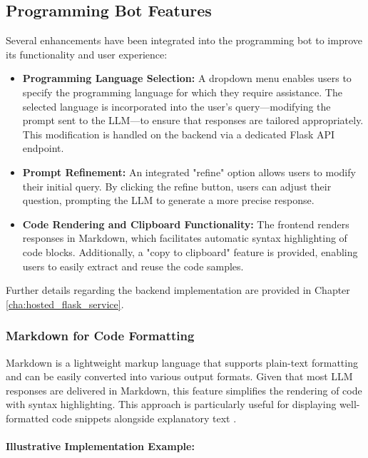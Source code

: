 \subsection{Programming Bot Features}

Several enhancements have been integrated into the programming bot to improve its functionality and user experience:

\begin{itemize}
  \item \textbf{Programming Language Selection:} A dropdown menu enables users to specify the programming language for which they require assistance. The selected language is incorporated into the user’s query—modifying the prompt sent to the LLM—to ensure that responses are tailored appropriately. This modification is handled on the backend via a dedicated Flask API endpoint.
  
  \item \textbf{Prompt Refinement:} An integrated "refine" option allows users to modify their initial query. By clicking the refine button, users can adjust their question, prompting the LLM to generate a more precise response.
  
  \item \textbf{Code Rendering and Clipboard Functionality:} The frontend renders responses in Markdown, which facilitates automatic syntax highlighting of code blocks. Additionally, a "copy to clipboard" feature is provided, enabling users to easily extract and reuse the code samples.
\end{itemize}

Further details regarding the backend implementation are provided in Chapter \ref{cha:hosted_flask_service}.

\subsubsection{Markdown for Code Formatting}

Markdown is a lightweight markup language that supports plain-text formatting and can be easily converted into various output formats. Given that most LLM responses are delivered in Markdown, this feature simplifies the rendering of code with syntax highlighting. This approach is particularly useful for displaying well-formatted code snippets alongside explanatory text \cite{What-Is-Markdown}.

\paragraph{Illustrative Implementation Example:}

